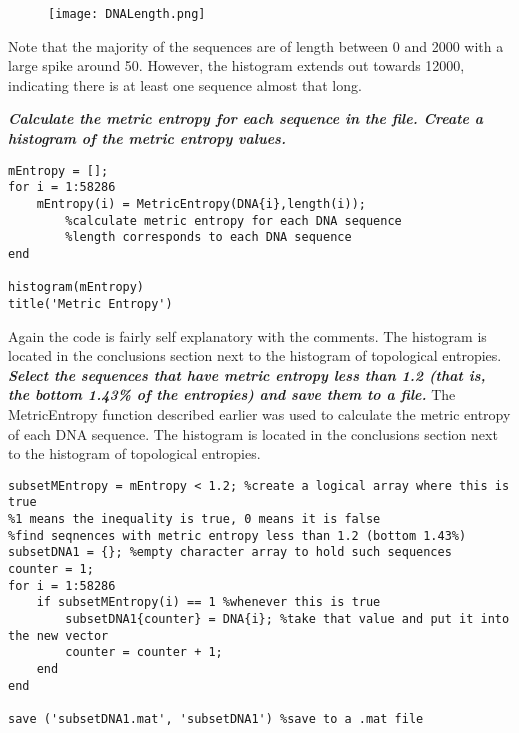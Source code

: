 \documentclass{article}
\begin{document}
\begin{figure}[H]
    \centering
    \texttt{[image: DNALength.png]}
    \label{fig:DNALength}
  \end{figure}
\noindent Note that the majority of the sequences are of length between 0 and 2000 with a large spike around 50.
However, the histogram extends out towards 12000, indicating there is at least one sequence almost that long.

\pagebreak

\noindent\textbf{\textit{Calculate the metric entropy for each sequence in the file. Create a histogram of the metric entropy values.}}
\newline
\begin{lstlisting}
mEntropy = [];
for i = 1:58286
    mEntropy(i) = MetricEntropy(DNA{i},length(i));
        %calculate metric entropy for each DNA sequence
        %length corresponds to each DNA sequence
end

histogram(mEntropy)
title('Metric Entropy')
\end{lstlisting}
Again the code is fairly self explanatory with the comments.
The histogram is located in the conclusions section next to the histogram of topological entropies.
\newline
\newline
\newline
\noindent\textbf{\textit{Select the sequences that have metric entropy less than 1.2 (that is, the bottom 1.43\% of the entropies) and save them to a file.}}
\newline
\newline
The MetricEntropy function described earlier was used to calculate the metric entropy of each DNA sequence.
The histogram is located in the conclusions section next to the histogram of topological entropies.
\newline
\begin{lstlisting}
subsetMEntropy = mEntropy < 1.2; %create a logical array where this is true
%1 means the inequality is true, 0 means it is false
%find seqnences with metric entropy less than 1.2 (bottom 1.43%)
subsetDNA1 = {}; %empty character array to hold such sequences
counter = 1;
for i = 1:58286
    if subsetMEntropy(i) == 1 %whenever this is true
        subsetDNA1{counter} = DNA{i}; %take that value and put it into the new vector
        counter = counter + 1;
    end
end

save ('subsetDNA1.mat', 'subsetDNA1') %save to a .mat file
\end{lstlisting}
\end{document}
